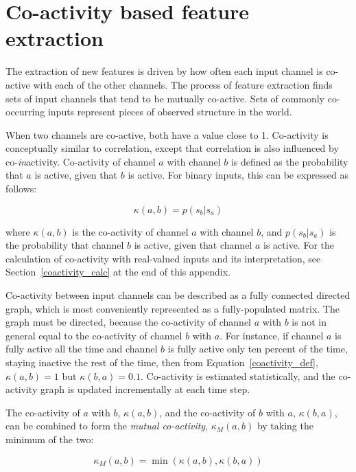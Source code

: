 \section{Co-activity based feature extraction}
The extraction of new features is driven by how often each input channel is co-active with each of the other channels. The process of feature extraction finds sets of input channels that tend to be mutually co-active. Sets of commonly co-occurring inputs represent pieces of observed structure in the world.

When two channels are co-active, both have a value close to 1. Co-activity is conceptually similar to correlation, except that correlation is also influenced by co-{\em in}activity. Co-activity of channel $a$ with channel $b$ is defined as the probability that $a$ is active, given that $b$ is active. For binary inputs, this can be expressed as follows:

\begin{equation}
\kappa(a,b) = p(s_b|s_a)
\label{coactivity_def}
\end{equation}

where $\kappa(a,b)$ is the co-activity of channel $a$ with channel $b$, and $p(s_b|s_a)$ is the probability that channel $b$ is active, given that channel $a$ is active. For the calculation of co-activity with real-valued inputs and its interpretation, see Section~\ref{coactivity_calc} at the end of this appendix. 

Co-activity between input channels can be described as a fully connected directed graph, which is most conveniently represented as a fully-populated matrix. The graph must be directed, because the co-activity of channel $a$ with $b$ is not in general equal to the co-activity of channel $b$ with $a$. For instance, if channel $a$ is fully active all the time and channel $b$ is fully active only ten percent of the time, staying inactive the rest of the time, then from Equation~\ref{coactivity_def}, $\kappa(a,b) = 1$ but $\kappa(b,a) = 0.1$. Co-activity is estimated statistically, and the co-activity graph is updated incrementally at each time step. 

The co-activity of $a$ with $b$,  $\kappa(a,b) $,  and the co-activity of $b$ with $a$, $\kappa(b,a) $, can be combined to form the {\em mutual co-activity},  $\kappa_M(a,b) $ by taking the minimum of the two:

\begin{equation}
\kappa_M(a,b)   = \min(\kappa(a,b), \kappa(b,a)) 
\end{equation}

